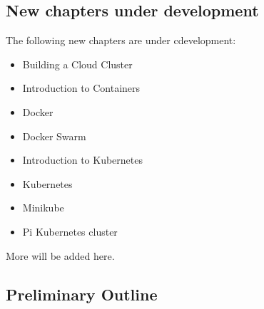 
\subsection{New chapters under
development}\label{new-chapters-under-development}

The following new chapters are under cdevelopment:

\begin{itemize}
\item Building a Cloud Cluster
\item Introduction to Containers
\item Docker
\item Docker Swarm
\item Introduction to Kubernetes
\item Kubernetes
\item Minikube
\item Pi Kubernetes cluster
\end{itemize}

More will be added here.

\subsection{Preliminary Outline}\label{preliminary-outline}

